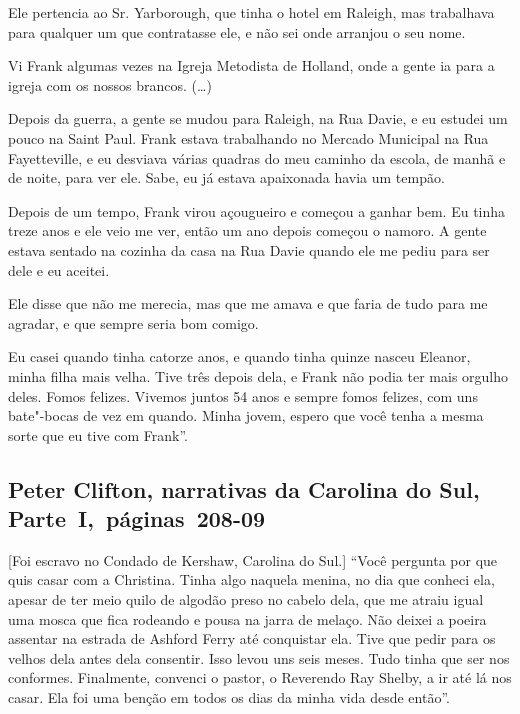 Ele pertencia ao Sr. Yarborough, que tinha o hotel em Raleigh, mas
trabalhava para qualquer um que contratasse ele, e não sei onde arranjou
o seu nome.

Vi Frank algumas vezes na Igreja Metodista de Holland, onde a gente ia
para a igreja com os nossos brancos. (\ldots{})

Depois da guerra, a gente se mudou para Raleigh, na Rua Davie, e eu
estudei um pouco na Saint Paul. Frank estava trabalhando no Mercado
Municipal na Rua Fayetteville, e eu desviava várias quadras do meu
caminho da escola, de manhã e de noite, para ver ele. Sabe, eu já estava
apaixonada havia um tempão.

Depois de um tempo, Frank virou açougueiro e começou a ganhar bem. Eu
tinha treze anos e ele veio me ver, então um ano depois começou o
namoro. A gente estava sentado na cozinha da casa na Rua Davie quando
ele me pediu para ser dele e eu aceitei.

Ele disse que não me merecia, mas que me amava e que faria de tudo para
me agradar, e que sempre seria bom comigo.

Eu casei quando tinha catorze anos, e quando tinha quinze nasceu
Eleanor, minha filha mais velha. Tive três depois dela, e Frank não
podia ter mais orgulho deles. Fomos felizes. Vivemos juntos 54 anos e
sempre fomos felizes, com uns bate"-bocas de vez em quando. Minha jovem,
espero que você tenha a mesma sorte que eu tive com Frank''.

\subsection{Peter Clifton, narrativas da Carolina do Sul, Parte~I,~páginas~208-09}

{[}Foi escravo no Condado de Kershaw, Carolina do Sul.{]} ``Você pergunta por que quis casar com a Christina. Tinha algo naquela
menina, no dia que conheci ela, apesar de ter meio quilo de algodão
preso no cabelo dela, que me atraiu igual uma mosca que fica rodeando e
pousa na jarra de melaço. Não deixei a poeira assentar na estrada de
Ashford Ferry até conquistar ela. Tive que pedir para os velhos dela
antes dela consentir. Isso levou uns seis meses. Tudo tinha que ser nos
conformes. Finalmente, convenci o pastor, o Reverendo Ray Shelby, a ir
até lá nos casar. Ela foi uma benção em todos os dias da minha vida
desde então''.


